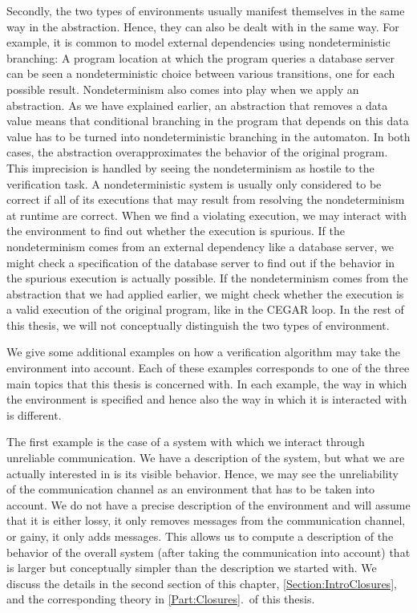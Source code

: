 \documentclass[../../diss.tex]{subfiles}
\begin{document}
Secondly, the two types of environments usually manifest themselves in the same way in the abstraction.
Hence, they can also be dealt with in the same way.
For example, it is common to model external dependencies using nondeterministic branching:
A program location at which the program queries a database server can be seen a nondeterministic choice between various transitions, one for each possible result.
Nondeterminism also comes into play when we apply an abstraction.
As we have explained earlier, an abstraction that removes a data value means that conditional branching in the program that depends on this data value has to be turned into nondeterministic branching in the automaton.
In both cases, the abstraction overapproximates the behavior of the original program.
This imprecision is handled by seeing the nondeterminism as hostile to the verification task.
A nondeterministic system is usually only considered to be correct if all of its executions that may result from resolving the nondeterminism at runtime are correct.
When we find a violating execution, we may interact with the environment to find out whether the execution is spurious.
If the nondeterminism comes from an external dependency like a database server, we might check a specification of the database server to find out if the behavior in the spurious execution is actually possible.
If the nondeterminism comes from the abstraction that we had applied earlier, we might check whether the execution is a valid execution of the original program, like in the CEGAR loop.
In the rest of this thesis, we will not conceptually distinguish the two types of environment.

We give some additional examples on how a verification algorithm may take the environment into account.
Each of these examples corresponds to one of the three main topics that this thesis is concerned with.
In each example, the way in which the environment is specified and hence also the way in which it is interacted with is different.

The first example is the case of a system with which we interact through unreliable communication.
We have a description of the system, but what we are actually interested in is its visible behavior.
Hence, we may see the unreliability of the communication channel as an environment that has to be taken into account.
We do not have a precise description of the environment and will assume that it is either lossy, \ie it only removes messages from the communication channel, or gainy, \ie it only adds messages.
This allows us to compute a description of the behavior of the overall system (\ie after taking the communication into account) that is larger but conceptually simpler than the description we started with.
We discuss the details in the second section of this chapter, \cref{Section:IntroClosures}, and the corresponding theory in \cref{Part:Closures}.~of this thesis.
\end{document}
